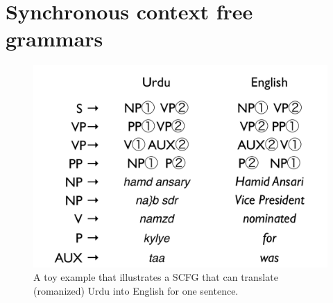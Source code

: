 \chapter{Synchronous context free grammars} \label{sec:scfg}

\begin{figure}
\begin{center}
\includegraphics[width=.6\linewidth]{SCFGs/example-scfg}
\end{center}
\caption{A toy example that illustrates a SCFG that can translate (romanized) Urdu into English for one sentence.    }\label{toy-scfg} 
\end{figure}


